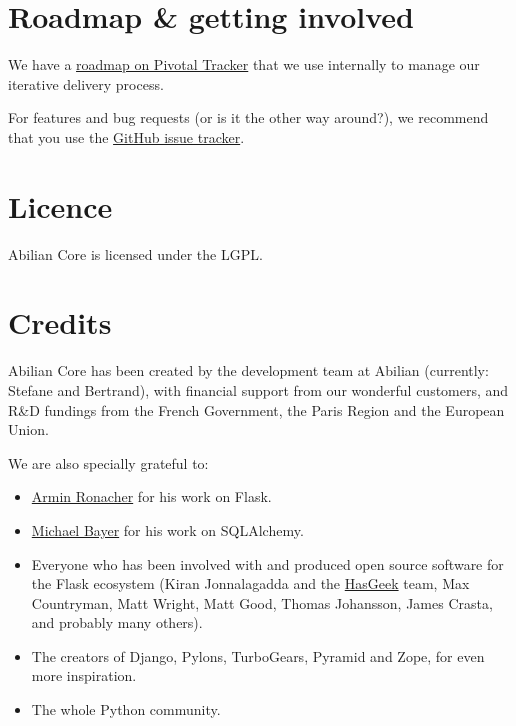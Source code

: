 \documentclass[a4paper,12pt,english]{sphinxmanual}
\begin{document}
\section{Roadmap \& getting involved}
\label{introduction:roadmap-getting-involved}
We have a \href{https://www.pivotaltracker.com/s/projects/878951}{roadmap on Pivotal
Tracker} that we use
internally to manage our iterative delivery process.

For features and bug requests (or is it the other way around?), we
recommend that you use the \href{https://github.com/abilian/abilian-core/issues}{GitHub issue
tracker}.


\section{Licence}
\label{introduction:licence}
Abilian Core is licensed under the LGPL.


\section{Credits}
\label{introduction:credits}
Abilian Core has been created by the development team at Abilian
(currently: Stefane and Bertrand), with financial support from our
wonderful customers, and R\&D fundings from the French Government, the
Paris Region and the European Union.

We are also specially grateful to:
\begin{itemize}
\item {} 
\href{http://lucumr.pocoo.org/}{Armin Ronacher} for his work on Flask.

\item {} 
\href{http://techspot.zzzeek.org/}{Michael Bayer} for his work on
SQLAlchemy.

\item {} 
Everyone who has been involved with and produced open source software
for the Flask ecosystem (Kiran Jonnalagadda and the
\href{https://hasgeek.com/}{HasGeek} team, Max Countryman, Matt Wright,
Matt Good, Thomas Johansson, James Crasta, and probably many others).

\item {} 
The creators of Django, Pylons, TurboGears, Pyramid and Zope, for
even more inspiration.

\item {} 
The whole Python community.

\end{itemize}
\end{document}
